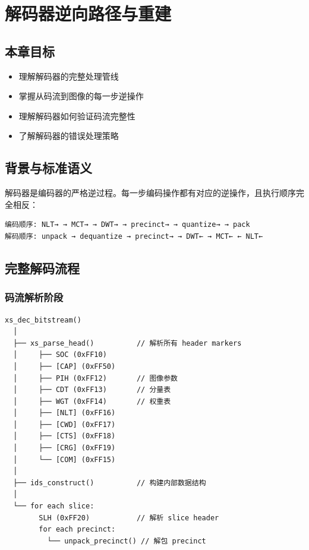 
\chapter{解码器逆向路径与重建}\label{ch:decoder}

\section{本章目标}

\begin{itemize}
  \item 理解解码器的完整处理管线
  \item 掌握从码流到图像的每一步逆操作
  \item 理解解码器如何验证码流完整性
  \item 了解解码器的错误处理策略
\end{itemize}

\section{背景与标准语义}

解码器是编码器的严格逆过程。每一步编码操作都有对应的逆操作，且执行顺序完全相反：

\begin{lstlisting}[numbers=none]
编码顺序: NLT→ → MCT→ → DWT→ → precinct→ → quantize→ → pack
解码顺序: unpack → dequantize → precinct→ → DWT← → MCT← ← NLT←
\end{lstlisting}

\section{完整解码流程}

\subsection{码流解析阶段}

\begin{lstlisting}[numbers=none]
xs_dec_bitstream()
  │
  ├── xs_parse_head()          // 解析所有 header markers
  │     ├── SOC (0xFF10)
  │     ├── [CAP] (0xFF50)
  │     ├── PIH (0xFF12)       // 图像参数
  │     ├── CDT (0xFF13)       // 分量表
  │     ├── WGT (0xFF14)       // 权重表
  │     ├── [NLT] (0xFF16)
  │     ├── [CWD] (0xFF17)
  │     ├── [CTS] (0xFF18)
  │     ├── [CRG] (0xFF19)
  │     └── [COM] (0xFF15)
  │
  ├── ids_construct()          // 构建内部数据结构
  │
  └── for each slice:
        SLH (0xFF20)           // 解析 slice header
        for each precinct:
          └── unpack_precinct() // 解包 precinct
\end{lstlisting}

